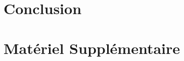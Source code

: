 \documentclass[titlepage,\numsides,openright,letterpaper,12pt]{book}
\begin{document}
\chapter{Conclusion}



\singlespacing

\appendix
\renewcommand\chapterstring{Annexe}
\chapter{Matériel Supplémentaire}



\end{document}
